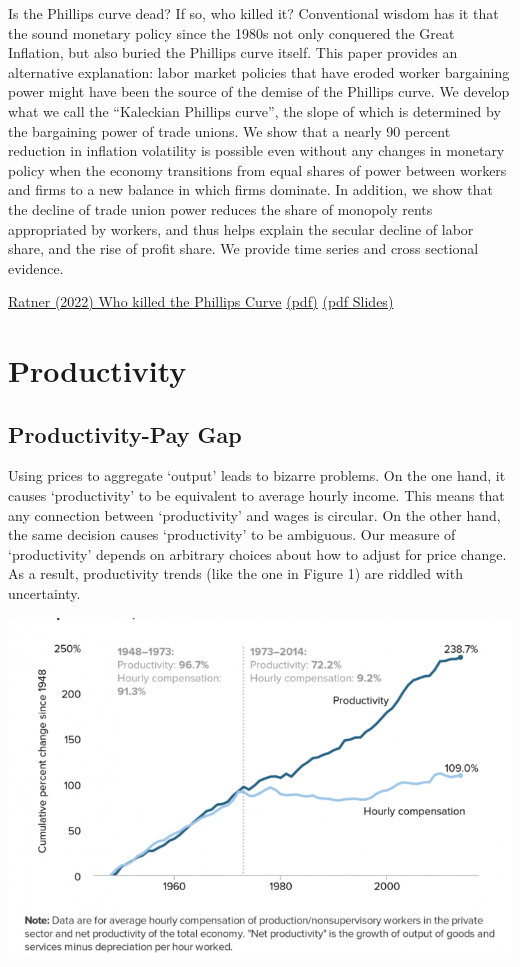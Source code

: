 \documentclass[
]{book}
\begin{document}
Is the Phillips curve dead? If so, who killed it? Conventional wisdom has it that the sound monetary policy since the 1980s not only conquered the Great Inflation, but also buried the Phillips curve itself. This paper provides an alternative explanation: labor market policies that have eroded worker bargaining power might have been the source of the demise of the Phillips curve. We develop what we call the ``Kaleckian Phillips curve'', the slope of which is determined by the bargaining power of trade unions. We show that a nearly 90 percent reduction in inflation volatility is possible even without any changes in monetary policy when the economy transitions from equal shares of power between workers and firms to a new balance in which firms dominate. In addition, we show that the decline of trade union power reduces the share of monopoly rents appropriated by workers, and thus helps explain the secular decline of labor share, and the rise of profit share. We provide time series and cross sectional evidence.

\href{https://papers.ssrn.com/sol3/papers.cfm?abstract_id=4118173}{Ratner (2022) Who killed the Phillips Curve}
\href{Ratner_2019_Who_killed_the_Phillips_Curve.pdf}{(pdf)}
\href{Ratner_2019_Who_killed_the_Phillips_Curve_Slides.pdf}{(pdf Slides)}

\hypertarget{productivity}{%
\chapter{Productivity}\label{productivity}}

\hypertarget{productivity-pay-gap}{%
\section{Productivity-Pay Gap}\label{productivity-pay-gap}}

Using prices to aggregate `output' leads to bizarre problems. On the one hand, it causes `productivity' to be equivalent to average hourly income. This means that any connection between `productivity' and wages is circular. On the other hand, the same decision causes `productivity' to be ambiguous. Our measure of `productivity' depends on arbitrary choices about how to adjust for price change. As a result, productivity trends (like the one in Figure 1) are riddled with uncertainty.

\includegraphics{fig/productivity_pay_gap.png}
\end{document}
